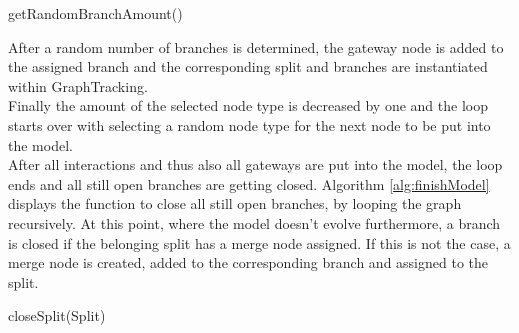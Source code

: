 \begin{algorithm}[H]
\DontPrintSemicolon
\SetAlgoLined
{}
\caption{getRandomBranchAmount()}
\label{alg:randBranchAmount}
\end{algorithm}

After a random number of branches is determined, the gateway node is added to the assigned branch and the corresponding split and branches are instantiated within GraphTracking.\\
Finally the amount of the selected node type is decreased by one and the loop starts over with selecting a random node type for the next node to be put into the model.\\
After all interactions and thus also all gateways are put into the model, the loop ends and all still open branches are getting closed. Algorithm \ref{alg:finishModel} displays the function to close all still open branches, by looping the graph recursively. At this point, where the model doesn't evolve furthermore, a branch is closed if the belonging split has a merge node assigned. If this is not the case, a merge node is created, added to the corresponding branch and assigned to the split.\\

\begin{algorithm}[H]
\DontPrintSemicolon
\SetAlgoLined
{}
\caption{closeSplit(Split)}
\label{alg:finishModel}
\end{algorithm}

